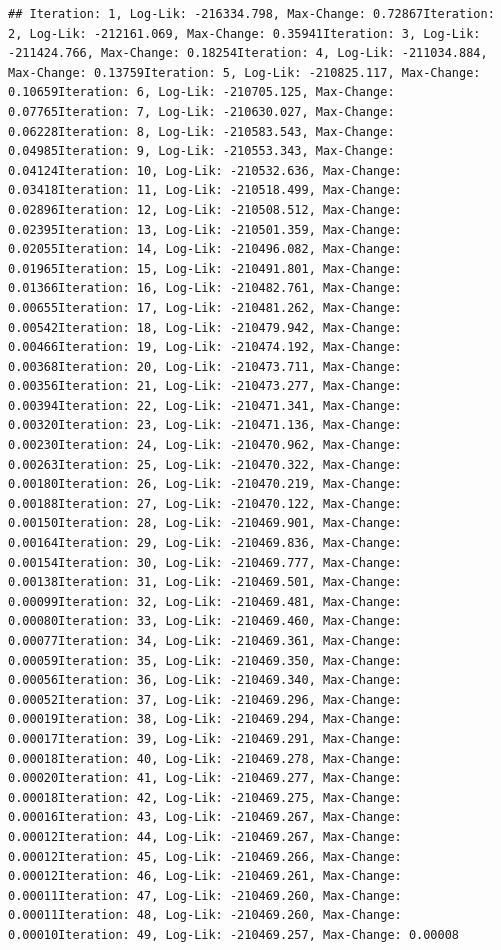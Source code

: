 \documentclass[
  jou]{apa6}
\begin{document}
\begin{verbatim}
## Iteration: 1, Log-Lik: -216334.798, Max-Change: 0.72867Iteration: 2, Log-Lik: -212161.069, Max-Change: 0.35941Iteration: 3, Log-Lik: -211424.766, Max-Change: 0.18254Iteration: 4, Log-Lik: -211034.884, Max-Change: 0.13759Iteration: 5, Log-Lik: -210825.117, Max-Change: 0.10659Iteration: 6, Log-Lik: -210705.125, Max-Change: 0.07765Iteration: 7, Log-Lik: -210630.027, Max-Change: 0.06228Iteration: 8, Log-Lik: -210583.543, Max-Change: 0.04985Iteration: 9, Log-Lik: -210553.343, Max-Change: 0.04124Iteration: 10, Log-Lik: -210532.636, Max-Change: 0.03418Iteration: 11, Log-Lik: -210518.499, Max-Change: 0.02896Iteration: 12, Log-Lik: -210508.512, Max-Change: 0.02395Iteration: 13, Log-Lik: -210501.359, Max-Change: 0.02055Iteration: 14, Log-Lik: -210496.082, Max-Change: 0.01965Iteration: 15, Log-Lik: -210491.801, Max-Change: 0.01366Iteration: 16, Log-Lik: -210482.761, Max-Change: 0.00655Iteration: 17, Log-Lik: -210481.262, Max-Change: 0.00542Iteration: 18, Log-Lik: -210479.942, Max-Change: 0.00466Iteration: 19, Log-Lik: -210474.192, Max-Change: 0.00368Iteration: 20, Log-Lik: -210473.711, Max-Change: 0.00356Iteration: 21, Log-Lik: -210473.277, Max-Change: 0.00394Iteration: 22, Log-Lik: -210471.341, Max-Change: 0.00320Iteration: 23, Log-Lik: -210471.136, Max-Change: 0.00230Iteration: 24, Log-Lik: -210470.962, Max-Change: 0.00263Iteration: 25, Log-Lik: -210470.322, Max-Change: 0.00180Iteration: 26, Log-Lik: -210470.219, Max-Change: 0.00188Iteration: 27, Log-Lik: -210470.122, Max-Change: 0.00150Iteration: 28, Log-Lik: -210469.901, Max-Change: 0.00164Iteration: 29, Log-Lik: -210469.836, Max-Change: 0.00154Iteration: 30, Log-Lik: -210469.777, Max-Change: 0.00138Iteration: 31, Log-Lik: -210469.501, Max-Change: 0.00099Iteration: 32, Log-Lik: -210469.481, Max-Change: 0.00080Iteration: 33, Log-Lik: -210469.460, Max-Change: 0.00077Iteration: 34, Log-Lik: -210469.361, Max-Change: 0.00059Iteration: 35, Log-Lik: -210469.350, Max-Change: 0.00056Iteration: 36, Log-Lik: -210469.340, Max-Change: 0.00052Iteration: 37, Log-Lik: -210469.296, Max-Change: 0.00019Iteration: 38, Log-Lik: -210469.294, Max-Change: 0.00017Iteration: 39, Log-Lik: -210469.291, Max-Change: 0.00018Iteration: 40, Log-Lik: -210469.278, Max-Change: 0.00020Iteration: 41, Log-Lik: -210469.277, Max-Change: 0.00018Iteration: 42, Log-Lik: -210469.275, Max-Change: 0.00016Iteration: 43, Log-Lik: -210469.267, Max-Change: 0.00012Iteration: 44, Log-Lik: -210469.267, Max-Change: 0.00012Iteration: 45, Log-Lik: -210469.266, Max-Change: 0.00012Iteration: 46, Log-Lik: -210469.261, Max-Change: 0.00011Iteration: 47, Log-Lik: -210469.260, Max-Change: 0.00011Iteration: 48, Log-Lik: -210469.260, Max-Change: 0.00010Iteration: 49, Log-Lik: -210469.257, Max-Change: 0.00008

\end{verbatim}
\end{document}
